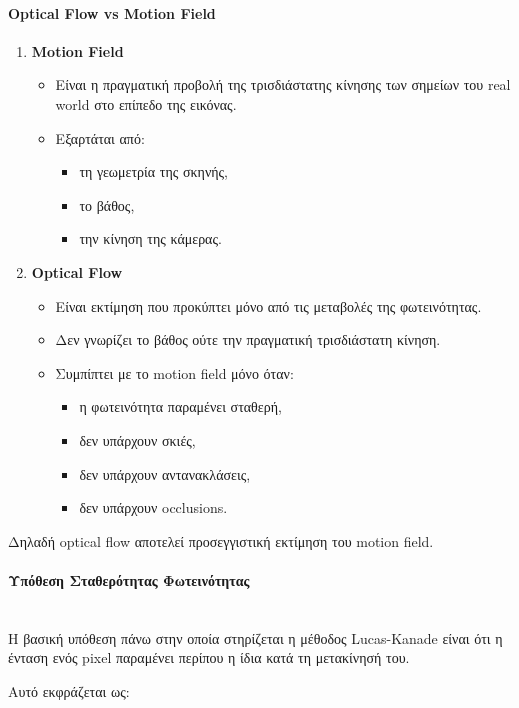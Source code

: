 \documentclass[12pt]{article}
\begin{document}
\paragraph{Optical Flow vs Motion Field}
\begin{enumerate}
  \item \textbf{Motion Field}
  \begin{itemize}
    \item Είναι η πραγματική προβολή της τρισδιάστατης κίνησης των σημείων του real world
    στο επίπεδο της εικόνας.
    \item Εξαρτάται από:
    \begin{itemize}
      \item τη γεωμετρία της σκηνής,
      \item το βάθος,
      \item την κίνηση της κάμερας.
    \end{itemize}
  \end{itemize}

  \item \textbf{Optical Flow}
  \begin{itemize}
    \item Είναι εκτίμηση που προκύπτει μόνο από τις μεταβολές της φωτεινότητας.
    \item Δεν γνωρίζει το βάθος ούτε την πραγματική τρισδιάστατη κίνηση.
    \item Συμπίπτει με το motion field μόνο όταν:
    \begin{itemize}
      \item η φωτεινότητα παραμένει σταθερή,
      \item δεν υπάρχουν σκιές,
      \item δεν υπάρχουν αντανακλάσεις,
      \item δεν υπάρχουν occlusions.
    \end{itemize}
  \end{itemize}
\end{enumerate}
Δηλαδή optical flow αποτελεί προσεγγιστική εκτίμηση του motion field.

\paragraph{Υπόθεση Σταθερότητας Φωτεινότητας}
\mbox{}\\
Η βασική υπόθεση πάνω στην οποία στηρίζεται η μέθοδος Lucas-Kanade είναι ότι η ένταση ενός pixel παραμένει περίπου η ίδια κατά τη μετακίνησή του.

Αυτό εκφράζεται ως:
\end{document}
